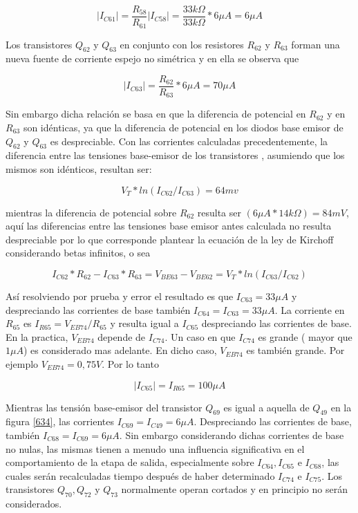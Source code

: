 \documentclass[12pt,a4paper,final,headinclude,footinclude,BCOR5mm]{scrartcl}
\begin{document}
$$|I_{C61}| = \frac{R_{58}}{R_{61}}|I_{C58}| = \frac{33 k\Omega}{33 k\Omega} * 6 \mu A = 6 \mu A$$


Los transistores $Q_{62}$ y $Q_{63}$ en conjunto con los resistores $R_{62}$ y $R_{63}$ forman una nueva fuente de corriente espejo no simétrica y en ella se observa que 

$$|I_{C63}| = \frac{R_{62}}{R_{63}} * 6 \mu A = 70 \mu A$$

Sin embargo dicha relación se basa en que la diferencia de potencial en $R_{62}$ y en $R_{63}$ son idénticas, ya que la diferencia de potencial en los diodos base emisor de $Q_{62}$ y $Q_{63}$ es despreciable. Con las corrientes calculadas precedentemente, la diferencia entre las tensiones base-emisor de los transistores , asumiendo que los mismos son idénticos, resultan ser:

$$V_{T} * ln(I_{C62}/I_{C63}) = 64 mv$$

mientras la diferencia de potencial sobre $R_{62}$ resulta ser $(6 \mu A * 14 k\Omega) = 84 mV$, aquí las diferencias entre las tensiones base emisor antes calculada no resulta despreciable por lo que corresponde plantear la ecuación de la ley de Kirchoff considerando betas infinitos, o sea

\begin{equation}
I_{C62}*R_{62} - I_{C63}*R_{63} = V_{BE63} - V_{BE62} = V_{T} *  ln(I_{C63}/ I_{C62})
\label{z}
\end{equation}


Así resolviendo por prueba y error el resultado es que  $I_{C63} = 33 \mu A$ y despreciando las corrientes de base también  $I_{C64} = I_{C63} = 33 \mu A$. La corriente en $R_{65}$ es $I_{R65} = V_{EB74} / R_{65}$  y resulta igual a $I_{C65}$ despreciando las corrientes de base. En la practica, $V_{EB74}$ depende de $I_{C74}$. Un caso en que $I_{C74}$ es grande ( mayor que $1 \mu A$) es considerado mas adelante. En dicho caso, $V_{EB74}$ es también grande. Por ejemplo $V_{EB74} = 0,75 V$. Por lo tanto 

$$|I_{C65}| = I_{R65} = 100 \mu A$$

Mientras las tensión base-emisor del transistor $Q_{69}$ es igual a aquella de $Q_{49}$ en la figura \ref{634}, las corrientes $I_{C69} = I_{C49} = 6 \mu A$. Despreciando las corrientes de base, también $I_{C68} = I_{C69} = 6 \mu A$. Sin embargo considerando dichas corrientes de base no nulas, las mismas tienen a menudo una influencia significativa en el comportamiento de la etapa de salida, especialmente sobre $I_{C64},I_{C65}$ e $I_{C68}$, las cuales serán recalculadas tiempo después de haber determinado $I_{C74}$ e $I_{C75}$. Los transistores $Q_{70}, Q_{72}$ y $Q_{73}$ normalmente operan cortados y en principio no serán considerados. 
\end{document}
